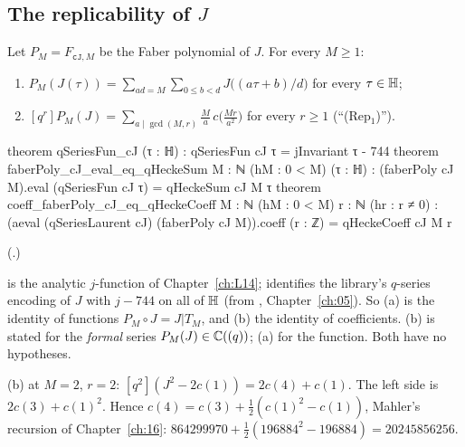 \subsection{The replicability of \texorpdfstring{$J$}{J}}

\begin{theorem}[$J$ is replicable]\label{ch19:thm:Jrep}
Let $P_M=F_{\mathtt{cJ},M}$ be the Faber polynomial of $J$.  For every $M\ge1$:
\begin{enumerate}[label=(\alph*)]
\item $P_M(J(\tau))=\sum_{ad=M}\sum_{0\le b<d}J\bigl((a\tau+b)/d\bigr)$ for every $\tau\in\mathbb{H}$;
\item $[q^r]P_M(J)=\sum_{a\mid\gcd(M,r)}\frac Ma\,c\bigl(\frac{Mr}{a^2}\bigr)$ for every $r\ge1$ (``(Rep$_1$)'').
\end{enumerate}
\end{theorem}
\begin{leancode}
theorem qSeriesFun_cJ (τ : ℍ) : qSeriesFun cJ τ = jInvariant τ - 744
theorem faberPoly_cJ_eval_eq_qHeckeSum {M : ℕ} (hM : 0 < M) (τ : ℍ) :
    (faberPoly cJ M).eval (qSeriesFun cJ τ) = qHeckeSum cJ M τ
theorem coeff_faberPoly_cJ_eq_qHeckeCoeff {M : ℕ} (hM : 0 < M) {r : ℕ} (hr : r ≠ 0) :
    (aeval (qSeriesLaurent cJ) (faberPoly cJ M)).coeff (r : ℤ) = qHeckeCoeff cJ M r
\end{leancode}
(.)
\begin{dictionary}
 is the analytic $j$-function of Chapter~\ref{ch:L14};  identifies the library's
$q$-series encoding of $J$ with $j-744$ on all of $\mathbb{H}$ (from , Chapter~\ref{ch:05}).  So
(a) is the identity of functions $P_M\circ J=J|T_M$, and (b) the identity of coefficients.  (b) is stated for the
\emph{formal} series $P_M(J)\in{\mathbb{C}}((q))$; (a) for the function.  Both have no hypotheses.
\end{dictionary}
\begin{example}[$M=2$]\label{ch19:ex:J2}
(b) at $M=2$, $r=2$: $[q^2](J^2-2c(1))=2c(4)+c(1)$.  The left side is $2c(3)+c(1)^2$.  Hence $c(4)=c(3)+\frac12(c(1)^2-c(1))$,
Mahler's recursion of Chapter~\ref{ch:16}: $864299970+\frac12(196884^2-196884)=20245856256$.
\end{example}
